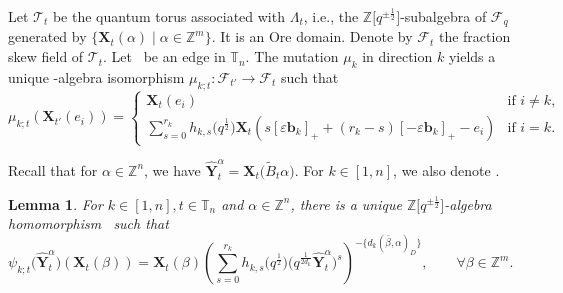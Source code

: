 \documentclass[pdftex]{sigma}
\newcommand{\Z}{\mathbb{Z}}
\numberwithin{equation}{section}
\newtheorem{Lemma}[Theorem]{Lemma}
\begin{document}
Let $\mathcal{T}_{t}$ be the quantum torus associated with $\Lambda_{t}$, i.e., the $\Z\big[q^{\pm\frac{1}{2}}\big]$-subalgebra of $\mathcal{F}_q$ generated by $\{\mathbf{X}_t(\alpha)\mid \alpha\in \Z^m\}$. It is an Ore domain. Denote by $\mathcal{F}_t$ the fraction skew field of $\mathcal{T}_t$.
Let~ be an edge in $\mathbb{T}_n$. The mutation $\mu_k$ in direction $k$ yields a unique \smash{$\Z\big[q^{\pm\frac{1}{2}}\big]$}-algebra isomorphism $\mu_{k;t}\colon\mathcal{F}_{t'}\to \mathcal{F}_t$ such that
\[
 \mu_{k;t}(\mathbf{X}_{t'}(e_i))=\begin{cases}
 \mathbf{X}_t(e_i) &\text{if $i\neq k$,}\\
 \displaystyle \sum\limits_{s=0}^{r_k}h_{k,s}\bigl(q^{\frac{1}{2}}\bigr)\mathbf{X}_t(s[\varepsilon \mathbf{b}_k]_{+}+(r_{k}-s)[-\varepsilon \mathbf{b}_k]_+-e_i)&\text{if $i=k$.}
 \end{cases}
\]

Recall that for $\alpha\in \Z^n$, we have $\hat{\mathbf{Y}}_t^\alpha=\mathbf{X}_t\bigl(\tilde{B}_t\alpha\bigr)$. For $k\in [1,n]$, we also denote .
\begin{Lemma}
 For $k\in[1,n],t\in\mathbb{T}_{n}$ and $\alpha\in\mathbb{Z}^{n}$, there is a unique $\Z\big[q^{\pm\frac{1}{2}}\big]$-algebra homomorphism~ such that
 \[
\psi_{k;t}\bigl(\mathbf{\hat{Y}}_{t}^{\alpha}\bigr)(\mathbf{X}_t(\beta))=\mathbf{X}_{t}(\beta)\left(\sum\limits_{s=0}^{r_k} h_{k,s}\bigl(q^{\frac{1}{2}}\bigr)\bigl(q^{\frac{1}{2d_{k}}}\mathbf{\hat{Y}}_{t}^{\alpha}\bigr)^{s}\right)^{-\{d_{k}(\bar{\beta},\alpha)_D\}}, \qquad \forall \beta\in \mathbb{Z}^m.
 \]
 \end{Lemma}
\end{document}
